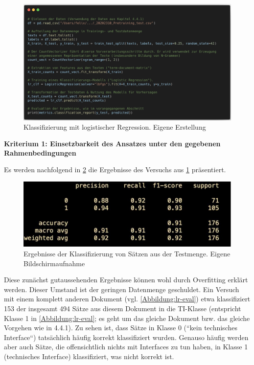 \begin{figure}[h]
\centering
\includegraphics[scale=0.4]{content/pics/Listing_2_.png}
\caption{Klassifizierung mit logistischer Regression. Eigene Erstellung}
\label{Abbildung:lr-code}
\end{figure}

{\bf Kriterium 1: Einsetzbarkeit des Ansatzes unter den gegebenen Rahmenbedingungen}

Es werden nachfolgend in \ref{Abbildung:lr-test} die Ergebnisse des Versuchs aus \ref{Abbildung:lr-code} präsentiert.

\begin{figure}[h]
\centering
\includegraphics[scale=0.95]{content/pics/Picture_27.png}
\caption{Ergebnisse der Klassifizierung von Sätzen aus der Testmenge. Eigene Bildschirmaufnahme}
\label{Abbildung:lr-test}
\end{figure}

Diese zunächst gutaussehenden Ergebnisse können wohl durch Overfitting erklärt werden. Dieser Umstand ist der geringen Datenmenge geschuldet. Ein Versuch mit einem komplett anderen Dokument (vgl. \ref{Abbildung:lr-eval}) etwa klassifiziert 153 der insgesamt 494 Sätze aus diesem Dokument in die TI-Klasse (entspricht Klasse 1 in \ref{Abbildung:lr-eval}; es geht um das gleiche Dokument bzw. das gleiche Vorgehen wie in 4.4.1). Zu sehen ist, dass Sätze in Klasse 0 (``kein technisches Interface``) tatsächlich häufig korrekt klassifiziert wurden. Genauso häufig werden aber auch Sätze, die offensichtlich nichts mit Interfaces zu tun haben, in Klasse 1 (technisches Interface) klassifiziert, was nicht korrekt ist.

